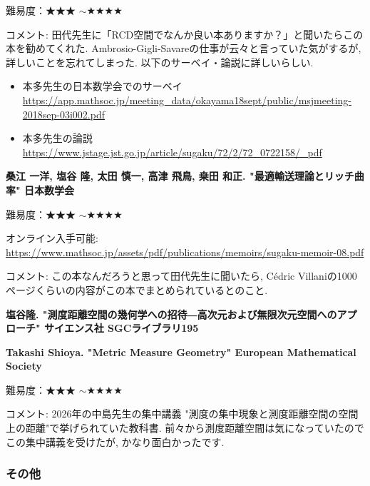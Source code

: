 難易度：★★★ $\sim$★★★★\vspace{-6pt} 

コメント: 田代先生に「RCD空間でなんか良い本ありますか？」と聞いたらこの本を勧めてくれた. 
Ambrosio-Gigli-Savareの仕事が云々と言っていた気がするが, 詳しいことを忘れてしまった. 
以下のサーベイ・論説に詳しいらしい. 
\begin{itemize}
\item 本多先生の日本数学会でのサーベイ \url{https://app.mathsoc.jp/meeting_data/okayama18sept/public/msjmeeting-2018sep-03i002.pdf}
\item 本多先生の論説 \url{https://www.jstage.jst.go.jp/article/sugaku/72/2/72_0722158/_pdf}
\end{itemize}


\vspace{8pt}

\textbf{桑江 一洋, 塩谷 隆, 太田 慎一, 高津 飛鳥, 桒田 和正. "最適輸送理論とリッチ曲率" 日本数学会}  　\vspace{-6pt} 

難易度：★★★ $\sim$★★★★\vspace{-6pt} 

オンライン入手可能: \url{https://www.mathsoc.jp/assets/pdf/publications/memoirs/sugaku-memoir-08.pdf}

コメント: この本なんだろうと思って田代先生に聞いたら, Cédric Villaniの1000ページくらいの内容がこの本でまとめられているとのこと. 


\textbf{塩谷隆. "測度距離空間の幾何学への招待―高次元および無限次元空間へのアプローチ" サイエンス社 SGCライブラリ195}　\vspace{-6pt} 

\textbf{Takashi Shioya. "Metric Measure Geometry" European Mathematical Society}　\vspace{-6pt} 

難易度：★★★ $\sim$★★★★　\vspace{-6pt} 

コメント: 2026年の中島先生の集中講義 "測度の集中現象と測度距離空間の空間上の距離"で挙げられていた教科書. 
前々から測度距離空間は気になっていたのでこの集中講義を受けたが, かなり面白かったです. 

\vspace{8pt}

\subsubsection{その他}

